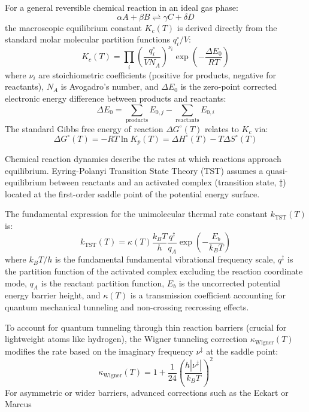 \documentclass[12pt]{article}
\begin{document}
For a general reversible chemical reaction in an ideal gas phase:
\begin{equation}
\alpha A + \beta B \rightleftharpoons \gamma C + \delta D
\end{equation}
the macroscopic equilibrium constant $K_c(T)$ is derived directly from the standard molar molecular partition functions $q_i^\circ / V$:
\begin{equation}
K_c(T) = \prod_i \left( \frac{q_i^\circ}{V N_A} \right)^{\nu_i} \exp\left( -\frac{\Delta E_0}{R T} \right)
\end{equation}
where $\nu_i$ are stoichiometric coefficients (positive for products, negative for reactants), $N_A$ is Avogadro's number, and $\Delta E_0$ is the zero-point corrected electronic energy difference between products and reactants:
\begin{equation}
\Delta E_0 = \sum_{\text{products}} E_{0,j} - \sum_{\text{reactants}} E_{0,i}
\end{equation}
The standard Gibbs free energy of reaction $\Delta G^\circ(T)$ relates to $K_c$ via:
\begin{equation}
\Delta G^\circ(T) = -R T \ln K_p(T) = \Delta H^\circ(T) - T \Delta S^\circ(T)
\end{equation}

Chemical reaction dynamics describe the rates at which reactions approach equilibrium. Eyring-Polanyi Transition State Theory (TST) assumes a quasi-equilibrium between reactants and an activated complex (transition state, $\ddagger$) located at the first-order saddle point of the potential energy surface.

The fundamental expression for the unimolecular thermal rate constant $k_{\text{TST}}(T)$ is:
\begin{equation}
k_{\text{TST}}(T) = \kappa(T) \frac{k_B T}{h} \frac{q^\ddagger}{q_A} \exp\left( -\frac{E_b}{k_B T} \right)
\end{equation}
where $k_B T / h$ is the fundamental fundamental vibrational frequency scale, $q^\ddagger$ is the partition function of the activated complex excluding the reaction coordinate mode, $q_A$ is the reactant partition function, $E_b$ is the uncorrected potential energy barrier height, and $\kappa(T)$ is a transmission coefficient accounting for quantum mechanical tunneling and non-crossing recrossing effects.

To account for quantum tunneling through thin reaction barriers (crucial for lightweight atoms like hydrogen), the Wigner tunneling correction $\kappa_{\text{Wigner}}(T)$ modifies the rate based on the imaginary frequency $\nu^\ddagger$ at the saddle point:
\begin{equation}
\kappa_{\text{Wigner}}(T) = 1 + \frac{1}{24} \left( \frac{h |\nu^\ddagger|}{k_B T} \right)^2
\end{equation}
For asymmetric or wider barriers, advanced corrections such as the Eckart or Marcus

\end{document}
